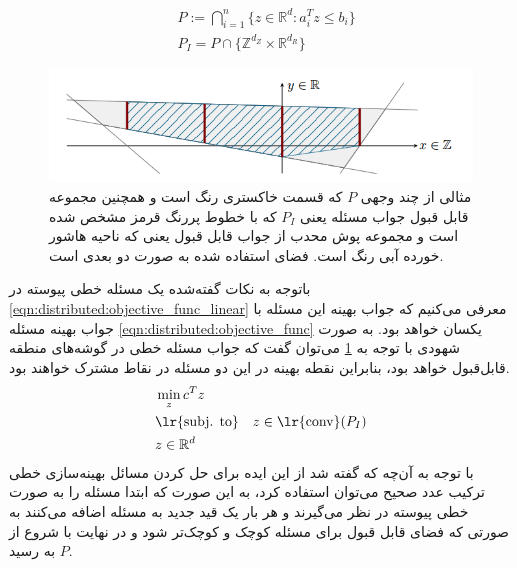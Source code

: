 \begin{align}
	&P := \bigcap_{i=1}^n \{ z \in \mathbb{R}^d : a_i^Tz \le b_i\} \label{eqn:distributed:constraint_cont} \\
	&P_I = P \cap \{\mathbb{Z}^{d_Z} \times \mathbb{R}^{d_R}\} \label{eqn:distributed:constraint_int}
\end{align}	

\begin{figure}[h]
	\centerline{\includegraphics[width=15cm]{graphics/4-heuristic-dist/polyhedron}}
	\caption{مثالی از چند وجهی $P$ که قسمت خاکستری رنگ است و همچنین مجموعه قابل قبول جواب مسئله یعنی $P_I$ که با خطوط پررنگ قرمز مشخص شده است و مجموعه پوش محدب از جواب قابل قبول یعنی  که ناحیه هاشور خورده آبی رنگ است. فضای استفاده شده به صورت دو بعدی است.}
	\label{fig:distributed:polyhedron}
\end{figure}
	باتوجه به نکات گفته‌شده یک مسئله خطی پیوسته در \cref{eqn:distributed:objective_func_linear} معرفی می‌کنیم که جواب بهینه‌ این مسئله با جواب بهینه مسئله \cref{eqn:distributed:objective_func} یکسان خواهد بود. به صورت شهودی با توجه به \cref{fig:distributed:polyhedron} می‌توان گفت که جواب مسئله خطی در گوشه‌های منطقه‌ قابل‌قبول خواهد بود، بنابراین نقطه بهینه در این دو مسئله در نقاط مشترک خواهند بود. 
	\begin{align}\label{eqn:distributed:objective_func_linear}
	&\min_{z}c^Tz \notag \\
	&\text{\lr{subj. to}} \quad z \in \text{\lr{conv}}(P_I) \notag \\
	&z \in \mathbb{R}^d
	\end{align}
	با توجه به آن‌چه که گفته شد از این ایده برای حل کردن مسائل بهینه‌سازی خطی ترکیب عدد صحیح می‌توان استفاده کرد، به این صورت که ابتدا مسئله را به صورت خطی پیوسته در نظر می‌گیرند و هر بار یک قید جدید به مسئله اضافه می‌کنند به صورتی که فضای قابل قبول برای مسئله کوچک و کوچک‌تر شود و در نهایت با شروع از $P$ به  رسید.
	

